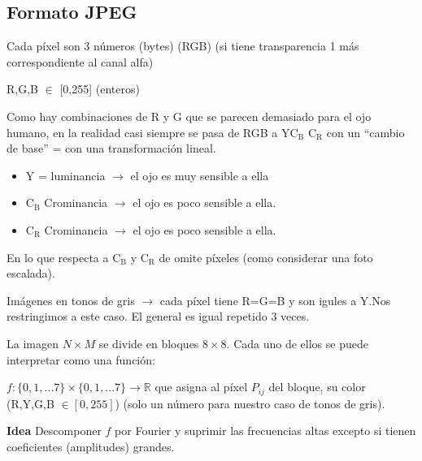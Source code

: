 	\subsection{Formato JPEG}

		\begin{center}
		\end{center}

		Cada píxel son 3 números (bytes) (RGB) (si tiene transparencia 1 más correspondiente al canal alfa)

		R,G,B $\in$ [0,255] (enteros)

		Como hay combinaciones de R y G que se parecen demasiado para el ojo humano, en la realidad casi siempre se pasa de RGB a Y$\text{C}_{\text{B}}$ $\text{C}_{\text{R}}$ con un ``cambio de base'' = con una transformación lineal.

		\begin{itemize}
			\item Y = luminancia $\rightarrow$ el ojo es muy sensible a ella
			\item $\text{C}_{\text{B}}$ Crominancia $\rightarrow$ el ojo es poco sensible a ella.
			\item $\text{C}_{\text{R}}$ Crominancia $\rightarrow$ el ojo es poco sensible a ella.
		\end{itemize}


		En lo que respecta a $\text{C}_{\text{B}}$ y $\text{C}_{\text{R}}$ de omite píxeles (como considerar una foto escalada).

		Imágenes en tonos de gris $\rightarrow$ cada píxel tiene R=G=B y son igules a Y.Nos restringimos a este caso. El general es igual repetido 3 veces.

		\begin{center}
		\end{center}

		La imagen $N \times M$ se divide en bloques $8 \times 8$. Cada uno de ellos se puede interpretar como una función:

		$f:\{0,1,...7\} \times \{0,1,...7\} \rightarrow \mathbb{R}$ que asigna al píxel $P_{ij}$ del bloque, su color (R,Y,G,B $\in [0,255]$) (solo un número para nuestro caso de tonos de gris).


		\textbf{Idea} Descomponer $f$ por Fourier y suprimir las frecuencias altas excepto si tienen coeficientes (amplitudes) grandes.









